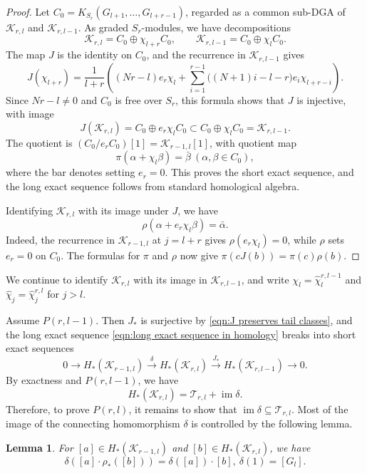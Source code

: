 \documentclass[reqno]{amsart}
\newtheorem{lem}[thm]{Lemma}
\theoremstyle{definition}
\theoremstyle{remark}
\newcommand{\cat}{\mathcal{T}}
\newcommand{\cak}{\mathcal{K}}
\newcommand{\whc}{\widehat{\chi}}
\begin{document}
\begin{proof}
Let $C_0=K_{S_r}(G_{l+1},\dots,G_{l+r-1})$, regarded as a common sub-DGA of $\cak_{r,l}$ and $\cak_{r,l-1}$. As graded $S_r$-modules, we have decompositions \[\cak_{r,l}=C_0\oplus\chi_{l+r}C_0,\qquad \cak_{r,l-1}=C_0\oplus\chi_lC_0.\] The map $J$ is the identity on $C_0$, and the recurrence in $\cak_{r,l-1}$ gives \[J(\chi_{l+r})=\frac{1}{l+r}\left((Nr-l)e_r\chi_l+\sum_{i=1}^{r-1}\bigl((N+1)i-l-r\bigr)e_i\chi_{l+r-i}\right).\]Since $Nr-l\ne0$ and $C_0$ is free over $S_r$, this formula shows that $J$ is injective, with image \[J(\cak_{r,l})=C_0\oplus e_r\chi_lC_0\subset C_0\oplus\chi_lC_0=\cak_{r,l-1}.\] The quotient is $(C_0/e_rC_0)[1]=\cak_{r-1,l}[1]$, with quotient map \[\pi(\alpha+\chi_l\beta)=\bar\beta\ (\alpha,\beta\in C_0),\]where the bar denotes setting $e_r=0$. This proves the short exact sequence, and the long exact sequence follows from standard homological algebra.%

Identifying $\cak_{r,l}$ with its image under $J$, we have
\[\rho(\alpha+e_r\chi_l\beta)=\bar\alpha.\]
Indeed, the recurrence in $\cak_{r-1,l}$ at $j=l+r$ gives $\rho(e_r\chi_l)=0$, while $\rho$ sets $e_r=0$ on $C_0$. The formulas for $\pi$ and $\rho$ now give $\pi(cJ(b))=\pi(c)\rho(b)$. 
\end{proof}

We continue to identify $\cak_{r,l}$ with its image in $\cak_{r,l-1}$, and write $\chi_l=\whc_l^{r,l-1}$ and $\whc_j=\whc_j^{r,l}$ for $j>l$.

Assume $P(r,l-1)$. Then $J_*$ is surjective by \eqref{eqn:J preserves tail classes}, and the long exact sequence \eqref{eqn:long exact sequence in homology} breaks into short exact sequences \[0\to H_*(\cak_{r-1,l})\xrightarrow{\delta}H_*(\cak_{r,l})\xrightarrow{J_*}H_*(\cak_{r,l-1})\to0.\] By exactness and $P(r,l-1)$, we have
\begin{equation}\label{eqn:tail algebra and delta image}H_*(\cak_{r,l})=\cat_{r,l}+\operatorname{im}\delta.\end{equation}Therefore, to prove $P(r,l)$, it remains to show that $\operatorname{im}\delta\subseteq\cat_{r,l}$. Most of the image of the connecting homomorphism $\delta$ is controlled by the following lemma.

\begin{lem}
For $[a]\in H_*(\cak_{r-1,l})$ and $[b]\in H_*(\cak_{r,l})$, we have \begin{equation}\label{eqn:projection formula for delta}\delta([a]\cdot \rho_*([b]))=\delta([a])\cdot [b],\ \delta(1)=[G_l].\end{equation}
\end{lem}
\end{document}
